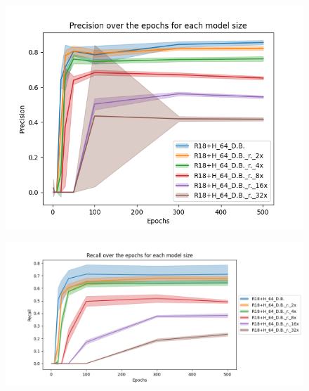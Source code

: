 \begin{figure}[!htbp]
    \centering
    \begin{minipage}[t]{.5\textwidth}%
      \centering
      \includegraphics[width=1\linewidth]{Figures/results/resnet18+head/r18+h_precision_over_epochs_reduced_models.png}
      \label{fig:resnet18+head_precision_reduced}
    \end{minipage}%
    \begin{minipage}[t]{.5\textwidth}%
      \centering
      \includegraphics[width=1\linewidth ]{Figures/results/resnet18+head/r18+h_recall_over_epochs_reduced_models.png}
      \label{fig:resnet18+head_recall_reduced}
    \end{minipage}
\end{figure}

